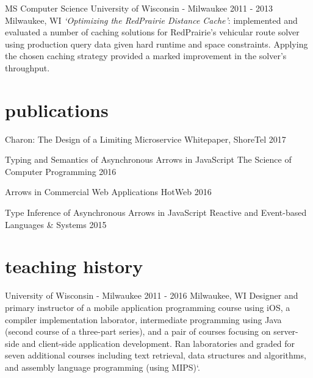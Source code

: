 \documentclass[]{clean-resume}
\begin{document}
\entry
  {MS Computer Science}
  {University of Wisconsin - Milwaukee}
  {2011 - 2013}
  {Milwaukee, WI}
  {
    \emph{`Optimizing the RedPrairie Distance Cache'}: implemented and evaluated a number of caching solutions for RedPrairie's vehicular route solver using production query data given hard runtime and space constraints. Applying the chosen caching strategy provided a marked improvement in the solver's throughput.
  }

\section{publications}

\shortentry
  {Charon: The Design of a Limiting Microservice}
  {Whitepaper, ShoreTel}
  {2017}

\shortentry
  {Typing and Semantics of Asynchronous Arrows in JavaScript}
  {The Science of Computer Programming}
  {2016}
  
\shortentry
  {Arrows in Commercial Web Applications}
  {HotWeb}
  {2016}
  
\shortentry
  {Type Inference of Asynchronous Arrows in JavaScript}
  {Reactive and Event-based Languages \& Systems}
  {2015}

\section{teaching history}

\entry
  {University of Wisconsin - Milwaukee}
  {}
  {2011 - 2016}
  {Milwaukee, WI}
  {
    Designer and primary instructor of a mobile application programming course using iOS, a compiler implementation laborator, intermediate programming using Java (second course of a three-part series), and a pair of courses focusing on server-side and client-side application development. Ran laboratories and graded for seven additional courses including text retrieval, data structures and algorithms, and assembly language programming (using MIPS)`.
  }
\end{document}
